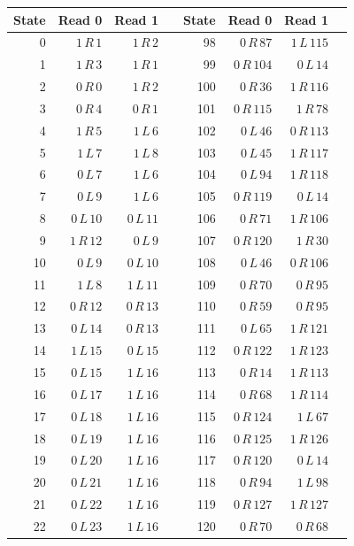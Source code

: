 \small
\begin{longtable}{rrrrrrrr}
\toprule State & Read 0 & Read 1 && State & Read 0 & Read 1 &\\\midrule\endhead
0 & $1\,R\,1$ & $1\,R\,2$ & & 98 & $0\,R\,87$ & $1\,L\,115$ &\\
1 & $1\,R\,3$ & $1\,R\,1$ & & 99 & $0\,R\,104$ & $0\,L\,14$ &\\
2 & $0\,R\,0$ & $1\,R\,2$ & & 100 & $0\,R\,36$ & $1\,R\,116$ &\\
3 & $0\,R\,4$ & $0\,R\,1$ & & 101 & $0\,R\,115$ & $1\,R\,78$ &\\
4 & $1\,R\,5$ & $1\,L\,6$ & & 102 & $0\,L\,46$ & $0\,R\,113$ &\\
5 & $1\,L\,7$ & $1\,L\,8$ & & 103 & $0\,L\,45$ & $1\,R\,117$ &\\
6 & $0\,L\,7$ & $1\,L\,6$ & & 104 & $0\,L\,94$ & $1\,R\,118$ &\\
7 & $0\,L\,9$ & $1\,L\,6$ & & 105 & $0\,R\,119$ & $0\,L\,14$ &\\
8 & $0\,L\,10$ & $0\,L\,11$ & & 106 & $0\,R\,71$ & $1\,R\,106$ &\\
9 & $1\,R\,12$ & $0\,L\,9$ & & 107 & $0\,R\,120$ & $1\,R\,30$ &\\
10 & $0\,L\,9$ & $0\,L\,10$ & & 108 & $0\,L\,46$ & $0\,R\,106$ &\\
11 & $1\,L\,8$ & $1\,L\,11$ & & 109 & $0\,R\,70$ & $0\,R\,95$ &\\
12 & $0\,R\,12$ & $0\,R\,13$ & & 110 & $0\,R\,59$ & $0\,R\,95$ &\\
13 & $0\,L\,14$ & $0\,R\,13$ & & 111 & $0\,L\,65$ & $1\,R\,121$ &\\
14 & $1\,L\,15$ & $0\,L\,15$ & & 112 & $0\,R\,122$ & $1\,R\,123$ &\\
15 & $0\,L\,15$ & $1\,L\,16$ & & 113 & $0\,R\,14$ & $1\,R\,113$ &\\
16 & $0\,L\,17$ & $1\,L\,16$ & & 114 & $0\,R\,68$ & $1\,R\,114$ &\\
17 & $0\,L\,18$ & $1\,L\,16$ & & 115 & $0\,R\,124$ & $1\,L\,67$ &\\
18 & $0\,L\,19$ & $1\,L\,16$ & & 116 & $0\,R\,125$ & $1\,R\,126$ &\\
19 & $0\,L\,20$ & $1\,L\,16$ & & 117 & $0\,R\,120$ & $0\,L\,14$ &\\
20 & $0\,L\,21$ & $1\,L\,16$ & & 118 & $0\,R\,94$ & $1\,L\,98$ &\\
21 & $0\,L\,22$ & $1\,L\,16$ & & 119 & $0\,R\,127$ & $1\,R\,127$ &\\
22 & $0\,L\,23$ & $1\,L\,16$ & & 120 & $0\,R\,70$ & $0\,R\,68$ &\\

\end{longtable}
